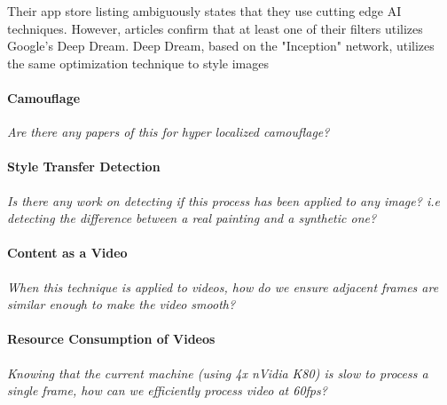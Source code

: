 \documentclass{article}
\begin{document}
Their app store listing ambiguously states that they use cutting edge AI
techniques. However, articles confirm that at least one of their filters
utilizes Google's Deep Dream. Deep Dream, based on the "Inception" network,
utilizes the same optimization technique to style images

\paragraph{Camouflage} \textit{Are there any papers of this for hyper
localized camouflage?}

\paragraph{Style Transfer Detection} \textit{Is there any work on detecting
if this process has been applied to any image? i.e detecting the difference
between a real painting and a synthetic one?}

\paragraph{Content as a Video} \textit{When this technique is applied to
videos, how do we ensure adjacent frames are similar enough to make the video
smooth?}

\paragraph{Resource Consumption of Videos} \textit{Knowing that the current
machine (using 4x nVidia K80) is slow to process a single frame, how can we
efficiently process video at 60fps?}





\begin{acronym}
\end{acronym}
\end{document}
